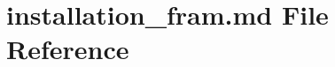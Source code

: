 \hypertarget{installation__fram_8md}{}\section{installation\+\_\+fram.\+md File Reference}
\label{installation__fram_8md}

